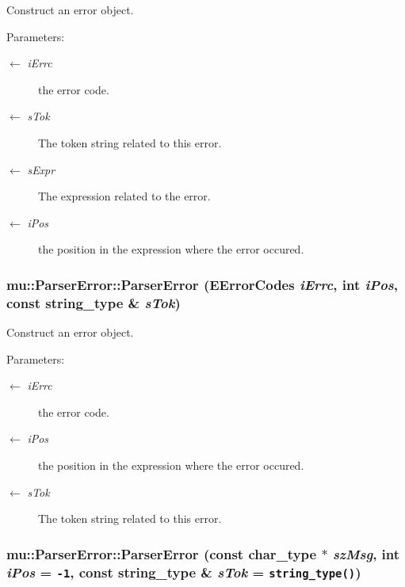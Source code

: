 Construct an error object. 

\begin{Desc}
\item[Parameters:]
\begin{description}
\item[\mbox{$\leftarrow$} {\em iErrc}]the error code. \item[\mbox{$\leftarrow$} {\em sTok}]The token string related to this error. \item[\mbox{$\leftarrow$} {\em sExpr}]The expression related to the error. \item[\mbox{$\leftarrow$} {\em iPos}]the position in the expression where the error occured. \end{description}
\end{Desc}
\subsubsection[ParserError]{\setlength{\rightskip}{0pt plus 5cm}mu::ParserError::ParserError ({\bf EErrorCodes} {\em iErrc}, \/  int {\em iPos}, \/  const {\bf string\_\-type} \& {\em sTok})}\label{classmu_1_1ParserError_b21ddceddd5ae816abc1060873a245b0}


Construct an error object. 

\begin{Desc}
\item[Parameters:]
\begin{description}
\item[\mbox{$\leftarrow$} {\em iErrc}]the error code. \item[\mbox{$\leftarrow$} {\em iPos}]the position in the expression where the error occured. \item[\mbox{$\leftarrow$} {\em sTok}]The token string related to this error. \end{description}
\end{Desc}
\subsubsection[ParserError]{\setlength{\rightskip}{0pt plus 5cm}mu::ParserError::ParserError (const {\bf char\_\-type} $\ast$ {\em szMsg}, \/  int {\em iPos} = {\tt -1}, \/  const {\bf string\_\-type} \& {\em sTok} = {\tt {\bf string\_\-type}()})}\label{classmu_1_1ParserError_c4f83d23ad5875683d4100a85f0fbdfc}


